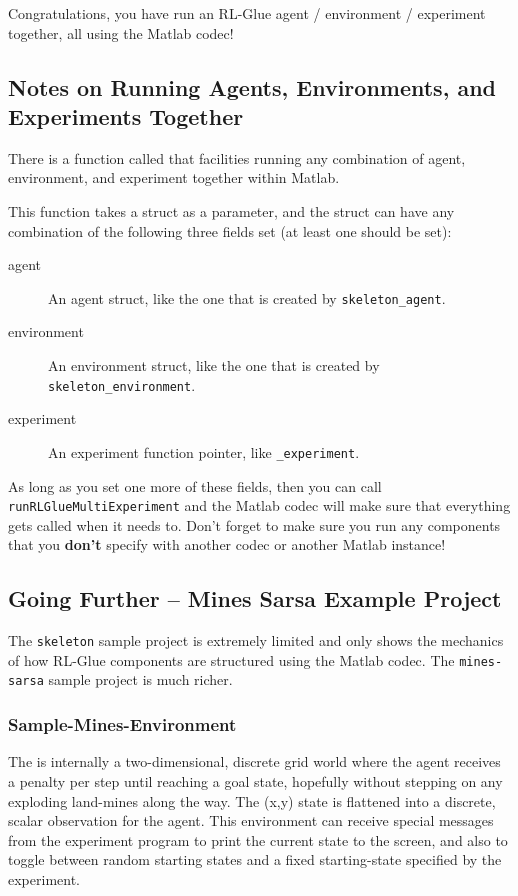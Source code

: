 \documentclass[11pt]{article}
\begin{document}
Congratulations, you have run an RL-Glue agent / environment / experiment together, all using the Matlab codec!

\subsection{Notes on Running Agents, Environments, and Experiments Together}
There is a function called  that facilities running any combination of agent, environment, and experiment together within Matlab.

This function takes a struct as a parameter, and the struct can have any combination of the following three fields set (at least one should be set):
\begin{description}
	\item[agent] An agent struct, like the one that is created by \texttt{skeleton\_agent}.
	\item[environment] An environment struct, like the one that is created by \texttt{skeleton\_environment}.
	\item[experiment] An experiment function pointer, like \texttt{\@skeleton\_experiment}.
\end{description}

As long as you set one more of these fields, then you can call \texttt{runRLGlueMultiExperiment} and the Matlab codec will make sure that everything gets called when it needs to. Don't forget to make sure you run any components that you \textbf{don't} specify with another codec or another Matlab instance!

\subsection{Going Further -- Mines Sarsa Example Project}
\label{mines-sarsa-sample}
The \texttt{skeleton} sample project is extremely limited and only shows the mechanics of how RL-Glue components are structured using the Matlab codec.  The \texttt{mines-sarsa} sample project is much richer.

\subsubsection{Sample-Mines-Environment}
\label{mines-sample}
The 
is internally a two-dimensional, discrete grid world where the agent receives a penalty per step until reaching a goal state, hopefully without stepping on any exploding land-mines along the way.  The (x,y) state is flattened into a discrete, scalar observation for the agent.  This environment can receive special messages from the experiment program to print the current state to the screen, and also to toggle between random starting states and a fixed starting-state specified by the experiment.
\end{document}
